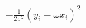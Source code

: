 \documentclass[preview]{standalone}
\begin{document}
\begin{align*}
-\frac{1}{2\sigma^2}(y_i -\omega x_i)^2
\end{align*}
\end{document}
